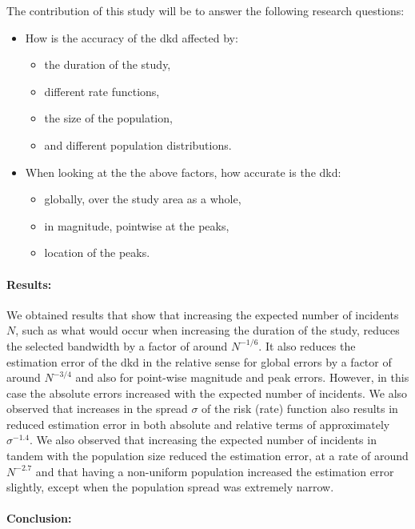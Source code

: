 \begin{onehalfspace}
The contribution of this study will be to answer the following research questions:
\begin{itemize}
    \item How is the accuracy of the \acrlong{dkd} affected by:
    \begin{itemize}
        \item the duration of the study,%
        \item different rate functions,%
        \item the size of the population,%
        \item and different population distributions.%
    \end{itemize}
    \item When looking at the the above factors,
    how accurate is the \acrlong{dkd}:
    \begin{itemize}
        \item globally, over the study area as a whole,%
        \item in magnitude, pointwise at the peaks,%
        \item location of the peaks.%
    \end{itemize}
\end{itemize}

\paragraph*{Results:}

We obtained results that show that increasing the expected number of incidents $N$,
such as what would occur when increasing the duration of the study,
reduces the selected bandwidth by a factor of around $N^{-1/6}$.
It also reduces the estimation error of the \acrlong{dkd} in the relative sense
for global errors by a factor of around $N^{-3/4}$ and also for point-wise magnitude and peak errors.
However, in this case the absolute errors increased with the expected number of incidents.
We also observed that increases in the spread $\sigma$ of the risk (rate) function also results in reduced estimation error
in both absolute and relative terms of approximately $\sigma^{-1.4}$.
We also observed that increasing the expected number of incidents in tandem with the population size reduced the estimation error,
at a rate of around $N^{-2.7}$
and that having a non-uniform population increased the estimation error slightly, 
except when the population spread was extremely narrow.

\paragraph*{Conclusion:}


\end{onehalfspace}
